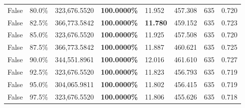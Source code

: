 \begin{table}[H]
\begin{tabular}{lllrllll}
\cline{1-8}
False & 80.0\% & 323,676.5520 & \bfseries \color{red} 100.0000\% & 11.952 & 457.308 & 635 & 0.720 \\
\cline{1-8}
False & 82.5\% & 366,773.5842 & \bfseries \color{red} 100.0000\% & \bfseries \color{red} 11.780 & 459.152 & 635 & 0.723 \\
\cline{1-8}
False & 85.0\% & 323,676.5520 & \bfseries \color{red} 100.0000\% & 11.925 & 457.508 & 635 & 0.720 \\
\cline{1-8}
False & 87.5\% & 366,773.5842 & \bfseries \color{red} 100.0000\% & 11.887 & 460.621 & 635 & 0.725 \\
\cline{1-8}
False & 90.0\% & 344,551.8961 & \bfseries \color{red} 100.0000\% & 12.016 & 461.610 & 635 & 0.727 \\
\cline{1-8}
False & 92.5\% & 323,676.5520 & \bfseries \color{red} 100.0000\% & 11.823 & 456.793 & 635 & 0.719 \\
\cline{1-8}
False & 95.0\% & 304,065.9811 & \bfseries \color{red} 100.0000\% & 11.802 & 456.415 & 635 & 0.719 \\
\cline{1-8}
False & 97.5\% & 323,676.5520 & \bfseries \color{red} 100.0000\% & 11.806 & 455.626 & 635 & 0.718 \\
\cline{1-8}
\bottomrule
\end{tabular}
\end{table}
